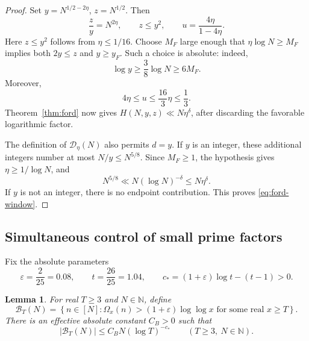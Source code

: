 \documentclass[11pt]{article}
\newtheorem{lemma}[theorem]{Lemma}
\theoremstyle{definition}
\theoremstyle{remark}
\numberwithin{equation}{section}
\newcommand{\N}{\mathbb N}
\newcommand{\eps}{\varepsilon}
\begin{document}
\begin{proof}
Set \(y=N^{1/2-2\eta}\), \(z=N^{1/2}\). Then
\[
 \frac zy=N^{2\eta},\qquad
 z\le y^2,\qquad
 u=\frac{4\eta}{1-4\eta}.
\]
Here \(z\le y^2\) follows from \(\eta\le1/16\). Choose \(M_F\)
large enough that \(\eta\log N\ge M_F\) implies both \(2y\le z\)
and \(y\ge y_F\). Such a choice is absolute: indeed,
\[
 \log y\ge\frac38\log N\ge6M_F.
\]
Moreover,
\[
 4\eta\le u\le\frac{16}3\eta\le\frac13.
\]
Theorem~\ref{thm:ford} now gives
\(H(N,y,z)\ll N\eta^\delta\), after discarding the favorable
logarithmic factor.

The definition of \(\mathcal D_\eta(N)\) also permits \(d=y\).
If \(y\) is an integer, these additional integers number at most
\(N/y\le N^{5/8}\). Since \(M_F\ge1\), the hypothesis gives
\(\eta\ge1/\log N\), and
\[
 N^{5/8}\ll N(\log N)^{-\delta}\le N\eta^\delta.
\]
If \(y\) is not an integer, there is no endpoint contribution.
This proves \eqref{eq:ford-window}.
\end{proof}

\subsection{Simultaneous control of small prime factors}

Fix the absolute parameters
\begin{equation}\label{eq:fixed-parameters}
 \eps=\frac2{25}=0.08,\qquad
 t=\frac{26}{25}=1.04,\qquad
 c_*=(1+\eps)\log t-(t-1)>0.
\end{equation}

\begin{lemma}\label{lem:exceptional}
For real \(T\ge3\) and \(N\in\N\), define
\[
 \mathcal B_T(N)=
 \left\{n\in[N]:
   \Omega_x(n)>(1+\eps)\log\log x
   \text{ for some real }x\ge T
 \right\}.
\]
There is an effective absolute constant \(C_B>0\) such that
\begin{equation}\label{eq:exceptional}
 |\mathcal B_T(N)|
 \le C_BN(\log T)^{-c_*}
 \qquad(T\ge3,\ N\in\N).
\end{equation}
\end{lemma}
\end{document}
